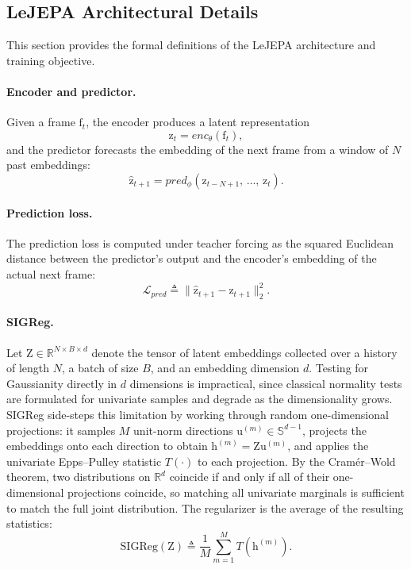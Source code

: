 \documentclass[11pt, a4paper]{article}
\begin{document}
\subsection*{LeJEPA Architectural Details}

This section provides the formal definitions of the LeJEPA architecture and training objective.

\paragraph{Encoder and predictor.} Given a frame $\mathrm{f}_t$, the encoder produces a latent representation
\begin{equation}
\mathrm{z}_t = enc_\theta(\mathrm{f}_t),
\end{equation}
and the predictor forecasts the embedding of the next frame from a window of $N$ past embeddings:
\begin{equation}
\mathrm{\hat{z}}_{t+1} = pred_\phi(\mathrm{z}_{t-N+1},\,\dots,\,\mathrm{z}_t).
\end{equation}

\paragraph{Prediction loss.} The prediction loss is computed under teacher forcing as the squared Euclidean distance between the predictor's output and the encoder's embedding of the actual next frame:
\begin{equation}
\mathcal{L}_{pred} \triangleq \lVert \mathrm{\hat{z}}_{t+1} - \mathrm{z}_{t+1} \rVert_2^2.
\end{equation}

\paragraph{SIGReg.} Let $\mathrm{Z} \in \mathbb{R}^{N \times B \times d}$ denote the tensor of latent embeddings collected over a history of length $N$, a batch of size $B$, and an embedding dimension $d$. Testing for Gaussianity directly in $d$ dimensions is impractical, since classical normality tests are formulated for univariate samples and degrade as the dimensionality grows. SIGReg side-steps this limitation by working through random one-dimensional projections: it samples $M$ unit-norm directions $\mathrm{u}^{(m)} \in \mathbb{S}^{d-1}$, projects the embeddings onto each direction to obtain $\mathrm{h}^{(m)} = \mathrm{Z}\mathrm{u}^{(m)}$, and applies the univariate Epps--Pulley statistic $T(\cdot)$ to each projection. By the Cram\'er--Wold theorem, two distributions on $\mathbb{R}^d$ coincide if and only if all of their one-dimensional projections coincide, so matching all univariate marginals is sufficient to match the full joint distribution. The regularizer is the average of the resulting statistics:
\begin{equation}
\mathrm{SIGReg}(\mathrm{Z}) \triangleq \frac{1}{M} \sum_{m=1}^{M} T(\mathrm{h}^{(m)}).
\end{equation}
\end{document}
